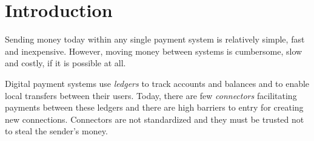 \documentclass[letterpaper,twocolumn,10pt]{article}
\begin{document}

\section{Introduction}

Sending money today within any single payment system is relatively simple, fast and inexpensive. However, moving money between systems is cumbersome, slow and costly, if it is possible at all. 


Digital payment systems use \textit{ledgers} to track accounts and balances and to enable local transfers between their users. Today, there are few \textit{connectors} facilitating payments between these ledgers and there are high barriers to entry for creating new connections. Connectors are not standardized and they must be trusted not to steal the sender's money.

\end{document}
